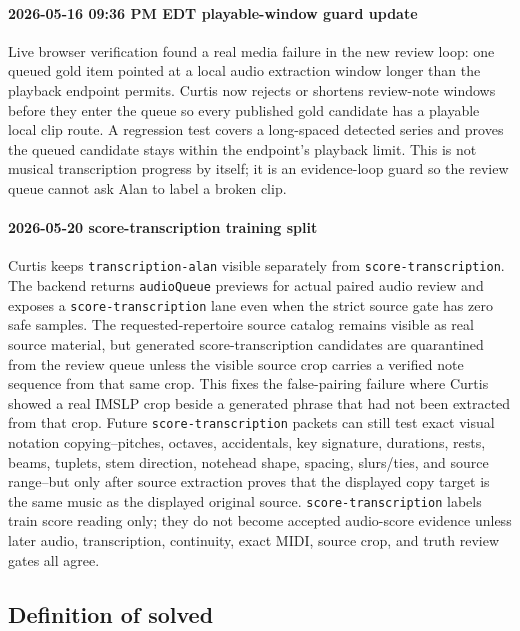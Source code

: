 \paragraph{2026-05-16 09:36 PM EDT playable-window guard update} Live browser verification found a real media failure in the new review loop: one queued gold item pointed at a local audio extraction window longer than the playback endpoint permits. Curtis now rejects or shortens review-note windows before they enter the queue so every published gold candidate has a playable local clip route. A regression test covers a long-spaced detected series and proves the queued candidate stays within the endpoint's playback limit. This is not musical transcription progress by itself; it is an evidence-loop guard so the review queue cannot ask Alan to label a broken clip.

\paragraph{2026-05-20 score-transcription training split} Curtis keeps \texttt{transcription-alan} visible separately from \texttt{score-transcription}. The backend returns \texttt{audioQueue} previews for actual paired audio review and exposes a \texttt{score-transcription} lane even when the strict source gate has zero safe samples. The requested-repertoire source catalog remains visible as real source material, but generated score-transcription candidates are quarantined from the review queue unless the visible source crop carries a verified note sequence from that same crop. This fixes the false-pairing failure where Curtis showed a real IMSLP crop beside a generated phrase that had not been extracted from that crop. Future \texttt{score-transcription} packets can still test exact visual notation copying--pitches, octaves, accidentals, key signature, durations, rests, beams, tuplets, stem direction, notehead shape, spacing, slurs/ties, and source range--but only after source extraction proves that the displayed copy target is the same music as the displayed original source. \texttt{score-transcription} labels train score reading only; they do not become accepted audio-score evidence unless later audio, transcription, continuity, exact MIDI, source crop, and truth review gates all agree.

\subsection{Definition of solved}

